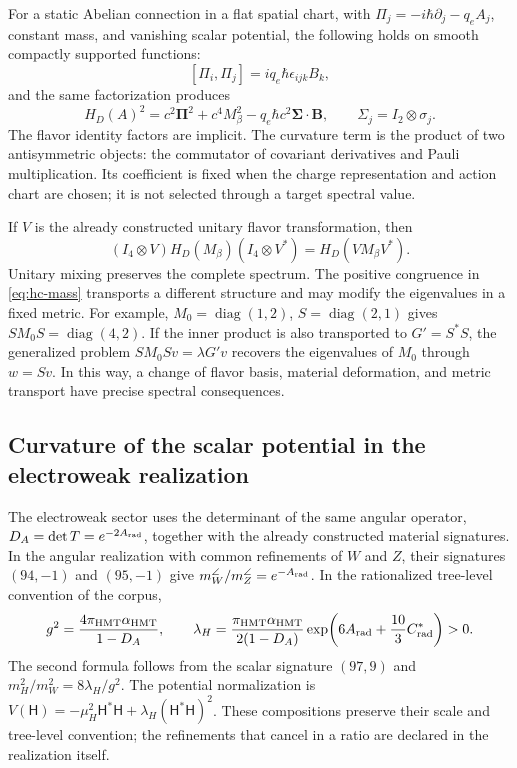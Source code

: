 For a static Abelian connection in a flat spatial chart, with
\(\Pi_j=-i\hbar\partial_j-q_eA_j\), constant mass, and vanishing
scalar potential, the following holds on smooth compactly supported functions:
\[
 [\Pi_i,\Pi_j]=iq_e\hbar\epsilon_{ijk}B_k,
\]
and the same factorization produces
\begin{equation}
 H_D(A)^2=c^2\boldsymbol\Pi^2+c^4M_\beta^2
 -q_e\hbar c^2\boldsymbol\Sigma\cdot\mathbf B,
 \qquad \Sigma_j=I_2\otimes\sigma_j.
 \label{eq:hc-dirac-curvature}
\end{equation}
The flavor identity factors are implicit. The curvature term
is the product of two antisymmetric objects: the commutator of covariant
derivatives and Pauli multiplication. Its coefficient is fixed
when the charge representation and action chart are chosen; it is not
selected through a target spectral value.

If \(V\) is the already constructed unitary flavor transformation, then
\[
 (I_4\otimes V)H_D(M_\beta)(I_4\otimes V^*)
 =H_D(VM_\beta V^*).
\]
Unitary mixing preserves the complete spectrum. The positive congruence
in \eqref{eq:hc-mass} transports a different structure and may modify the
eigenvalues in a fixed metric. For example,
\(M_0=\operatorname{diag}(1,2)\), \(S=\operatorname{diag}(2,1)\)
gives \(SM_0S=\operatorname{diag}(4,2)\). If the inner product
is also transported to \(G'=S^*S\), the generalized problem
\(SM_0Sv=\lambda G'v\) recovers the eigenvalues of \(M_0\)
through \(w=Sv\). In this way, a change of flavor basis, material
deformation, and metric transport have precise spectral consequences.

\subsection{Curvature of the scalar potential in the electroweak realization}

The electroweak sector uses the determinant of the same angular operator,
\(D_A=\det T=e^{-2A_{\rm rad}}\), together with the already constructed
material signatures. In the angular realization with common refinements of
\(W\) and \(Z\), their signatures \((94,-1)\) and \((95,-1)\) give
\(m_W^\angle/m_Z^\angle=e^{-A_{\rm rad}}\).
In the rationalized tree-level convention of the corpus,
\[
 g^2=\frac{4\pi_{\rm HMT}\alpha_{\rm HMT}}{1-D_A},\qquad
 \lambda_H=\frac{\pi_{\rm HMT}\alpha_{\rm HMT}}{2(1-D_A)}
 \exp\!\left(6A_{\rm rad}+\frac{10}3C^*_{\rm rad}\right)>0.
\]
The second formula follows from the scalar signature \((97,9)\) and
\(m_H^2/m_W^2=8\lambda_H/g^2\). The potential normalization is
\(V(\mathsf H)=-\mu_H^2\mathsf H^*\mathsf H
+\lambda_H(\mathsf H^*\mathsf H)^2\). These compositions preserve
their scale and tree-level convention; the refinements that cancel
in a ratio are declared in the realization itself.

